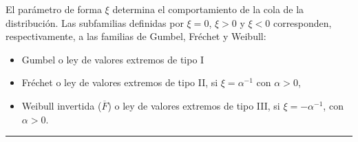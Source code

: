\begin{f}
\end{f}

\begin{f}
	
	El parámetro de forma \(\xi\) determina el comportamiento de la cola de la distribución. 
	Las subfamilias definidas por \(\xi = 0\), \(\xi > 0\) y \(\xi < 0\) corresponden, respectivamente, a las familias de Gumbel, Fréchet y Weibull:
	\begin{itemize}
		\item      Gumbel o ley de valores extremos de tipo I
		\item     Fréchet o ley de valores extremos de tipo II, si \(\xi  = \alpha^{-1}\) con \(\alpha>0\),
		\item    Weibull invertida (\(\overline{F}\)) o ley de valores extremos de tipo III, si \(\xi =-\alpha^{-1} \), con \(\alpha>0\).
	\end{itemize}
\end{f}
\hrule 


